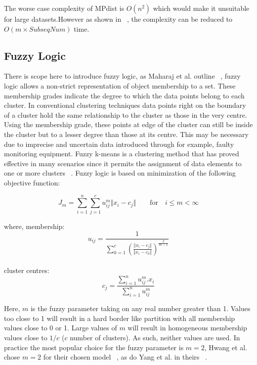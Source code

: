 The worse case complexity of MPdist is $O(n^2)$ which would make it unsuitable for large datasets.However as shown in ~\cite{Gharghabi2018AnUT}, the complexity can be reduced to $O(m \times SubseqNum)$ time.



\subsection{Fuzzy Logic}
There is scope here to introduce fuzzy logic, as  Maharaj et al. outline ~\cite{MAHARAJ20111187}, fuzzy logic allows a non-strict representation of object membership to a set. These membership grades indicate the degree to which the data points belong to each cluster. In conventional clustering techniques data points right on the boundary of a cluster hold the same relationship to the cluster as those in the very centre. Using the membership grade, these points at edge of the cluster can still be inside the cluster but to a lesser degree than those at its centre. This may be necessary due to imprecise and uncertain data introduced through for example, faulty monitoring equipment. Fuzzy k-means is a clustering method that has proved effective in many scenarios since it permits the assignment of data elements to one or more clusters ~\cite{MOLINASOLANA2017598}. Fuzzy logic is based on minimization of the following objective function:

\begin{equation}
J_m = \sum_{i=1}^{n} \sum_{j=1}^{c} u_{ij}^{m} \Vert x_i - c_j \Vert  \qquad  \textrm{for}   \quad i \leq m < \infty
\end{equation}

where, membership:
\begin{equation}
u_{ij} = \frac{1}{\sum_{k=1}^c (\frac{\Vert x_i - c_j \Vert}{\Vert x_i - c_k \Vert})^ \frac{2}{m-1}}
\end{equation}\\
cluster centres:
\begin{equation}
c_j = \frac{\sum_{i=1}^n u_{ij}^m . x_i}{\sum_{i=1}^n u_{ij}^m}
\end{equation}


Here, $m$ is the fuzzy parameter taking on any real number greater than 1. Values too close to 1 will result in a hard border like partition with all membership values close to 0 or 1. Large values of $m$ will result in homogeneous membership values close to $1/c$ ($c$ number of clusters). As such, neither values are used. In practice the most popular choice for the fuzzy parameter is $m = 2$, Hwang et al. chose $m = 2$ for their chosen model ~\cite{hwang}, as do Yang et al. in theirs ~\cite{4522596}. \\

